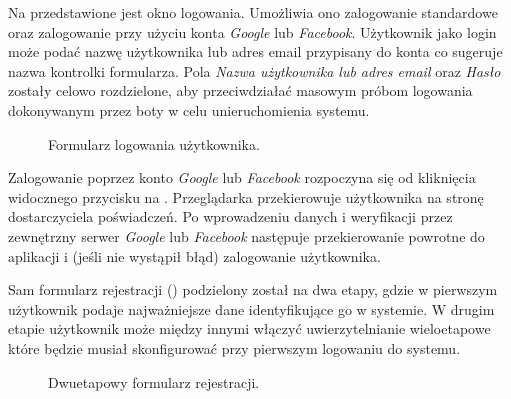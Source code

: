 

Na  przedstawione jest okno logowania. Umożliwia ono zalogowanie standardowe oraz zalogowanie
przy użyciu konta \textit{Google} lub \textit{Facebook}. Użytkownik jako login może podać nazwę użytkownika lub adres
email przypisany do konta co sugeruje nazwa kontrolki formularza. Pola \textit{Nazwa użytkownika lub adres email} oraz
\textit{Hasło} zostały celowo rozdzielone, aby przeciwdziałać masowym próbom logowania dokonywanym przez boty w celu
unieruchomienia systemu.
%
\begin{figure}[H]
  \centering
  \caption{Formularz logowania użytkownika.}
  \label{fig:login-form}
\end{figure}

Zalogowanie poprzez konto \textit{Google} lub \textit{Facebook} rozpoczyna się od kliknięcia widocznego przycisku na
. Przeglądarka przekierowuje użytkownika na stronę dostarczyciela poświadczeń. Po wprowadzeniu
danych i weryfikacji przez zewnętrzny serwer \textit{Google} lub \textit{Facebook} następuje przekierowanie powrotne do
aplikacji i (jeśli nie wystąpił błąd) zalogowanie użytkownika.

Sam formularz rejestracji () podzielony został na dwa etapy, gdzie w pierwszym użytkownik
podaje najważniejsze dane identyfikujące go w systemie. W drugim etapie użytkownik może między innymi włączyć
uwierzytelnianie wieloetapowe które będzie musiał skonfigurować przy pierwszym logowaniu do systemu.
%
\begin{figure}[H]
  \centering
  \begin{subfigure}[b]{0.48\textwidth}
    \centering
  \end{subfigure}
  \hfill
  \begin{subfigure}[b]{0.48\textwidth}
    \centering
  \end{subfigure}
  \caption{Dwuetapowy formularz rejestracji.}
  \label{fig:register-form}
\end{figure}

